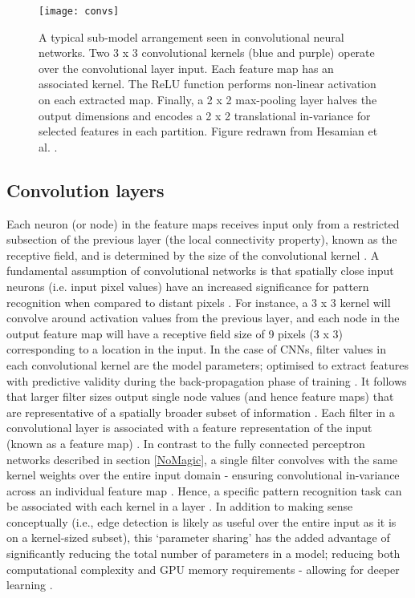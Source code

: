 \begin{figure}[h]
	\begin{center}
		\texttt{[image: convs]}
		\caption{A typical sub-model arrangement seen in convolutional neural
      networks. Two 3 x 3 convolutional kernels (blue and purple) operate over
      the convolutional layer input. Each feature map has an associated kernel.
      The ReLU function performs non-linear activation on each extracted map.
      Finally, a 2 x 2 max-pooling layer halves the output dimensions and
      encodes a 2 x 2 translational in-variance for selected features in each
      partition. Figure redrawn from Hesamian et al. \cite{Hesamian2019}.}
		\label{fig:convs}
	\end{center}
\end{figure}

\subsection{Convolution layers}
Each neuron (or node) in the feature maps receives input only from a restricted
subsection of the previous layer (the local connectivity property), known as the
receptive field, and is determined by the size of the convolutional kernel
\cite{Hesamian2019}. A fundamental assumption of convolutional networks is that
spatially close input neurons (i.e. input pixel values) have an increased
significance for pattern recognition when compared to distant pixels
\cite{Hu2015}. For instance, a 3 x 3 kernel will convolve around activation
values from the previous layer, and each node in the output feature map will
have a receptive field size of 9 pixels (3 x 3) corresponding to a location in
the input. In the case of CNNs, filter values in each convolutional kernel are
the model parameters; optimised to extract features with predictive validity
during the back-propagation phase of training \cite{Maier2019}. It follows that
larger filter sizes output single node values (and hence feature maps) that are
representative of a spatially broader subset of information \cite{Nemoto_2020}.
Each filter in a convolutional layer is associated with a feature representation
of the input (known as a feature map) \cite{Hesamian2019}. In contrast to the
fully connected perceptron networks described in section \ref{NoMagic}, a single
filter convolves with the same kernel weights over the entire input domain -
ensuring convolutional in-variance across an individual feature map
\cite{Maier2019}. Hence, a specific pattern recognition task can be associated
with each kernel in a layer \cite{Zeiler_2014}. In addition to making sense
conceptually (i.e., edge detection is likely as useful over the entire input as
it is on a kernel-sized subset), this `parameter sharing' has the added
advantage of significantly reducing the total number of parameters in a model;
reducing both computational complexity and GPU memory requirements - allowing
for deeper learning \cite{Lundervold2019}.

